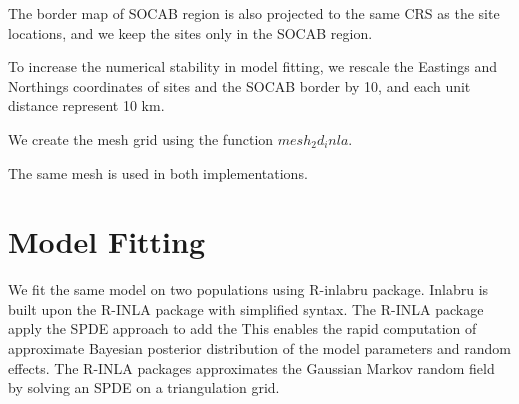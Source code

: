 The border map of SOCAB region is also projected to the same CRS as the site locations, and we keep
the sites only in the SOCAB region. 

To increase the numerical stability in model fitting, we rescale the Eastings and Northings 
coordinates of sites and the SOCAB border by 10, and each unit distance represent 10 km.

We create the mesh grid using the function $mesh_2d_inla$. 

The same mesh is used in both implementations. 


\section{Model Fitting}
We fit the same model on two populations using R-inlabru package. Inlabru is built upon the R-INLA 
package with simplified syntax. The R-INLA package apply the SPDE approach to add the
This enables the rapid computation of approximate Bayesian posterior distribution of the model 
parameters and random effects. The R-INLA packages approximates the Gaussian Markov random field by
solving an SPDE on a triangulation grid.
